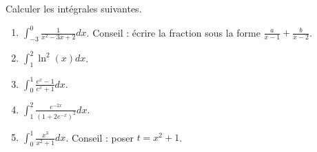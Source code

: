 
\begin{exercice}\label{exoTD5-0003}

	Calculer les intégrales suivantes.
	
		\begin{enumerate}
			\item
				$\displaystyle\int_{-3}^0\frac{1}{ x^2-3x+2 }dx$. Conseil : écrire la fraction sous la forme $\frac{ a }{ x-1 }+\frac{ b }{ x-2 }$.
			\item
				$\displaystyle\int_1^2\ln^2(x)dx$.
			\item
				$\displaystyle\int_0^1\frac{ e^x-1 }{ e^x+1 }dx$.
			\item
				$\displaystyle\int_1^2\frac{  e^{-2x} }{ (1+2 e^{-x})^2 }dx$.
			\item
				$\displaystyle\int_0^1\frac{ x^3 }{ x^2+1 }dx$. Conseil : poser $t=x^2+1$.
		\end{enumerate}
	

\end{exercice}
